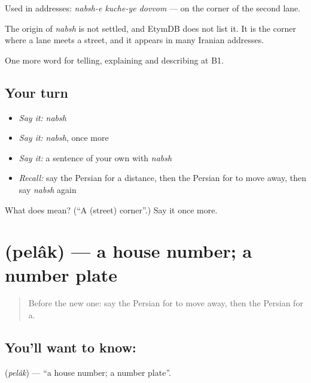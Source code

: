 Used in addresses: \emph{nabsh-e kuche-ye dovvom} — on the corner of the second lane.

\begin{cousinweb}
The origin of \emph{nabsh} is not settled, and EtymDB does not list it. It is the corner where a lane meets a street, and it appears in many Iranian addresses.
\end{cousinweb}

\begin{grammarlens}[title={What you've built}]
One more word for telling, explaining and describing at B1.
\end{grammarlens}

\subsection*{Your turn}
\begin{itemize}
\raggedright
  \item \emph{Say it:} \emph{nabsh}
  \item \emph{Say it:} \emph{nabsh}, once more
  \item \emph{Say it:} a sentence of your own with \emph{nabsh}
  \item \emph{Recall:} say the Persian for a distance, then the Persian for to move away, then say \emph{nabsh} again
\end{itemize}

\begin{tcolorbox}[breakable,colback=teal!4,colframe=teal!35!black,title={Before you move on}]
What does  mean? (\textquotedblleft{}A (street) corner\textquotedblright{}.) Say it once more.
\end{tcolorbox}
\section[\texorpdfstring{\fa{پلاک} (pelâk)}{پلاک (pelâk)}]{ (pelâk) — a house number; a number plate}

\label{lesson:FA-C447-pelak}



\begin{quote}
Before the new one: say the Persian for to move away, then the Persian for a.
\end{quote}

\subsection*{You'll want to know: }
\textbf{} (\emph{pelâk}) — \textquotedblleft{}a house number; a number plate\textquotedblright{}.

